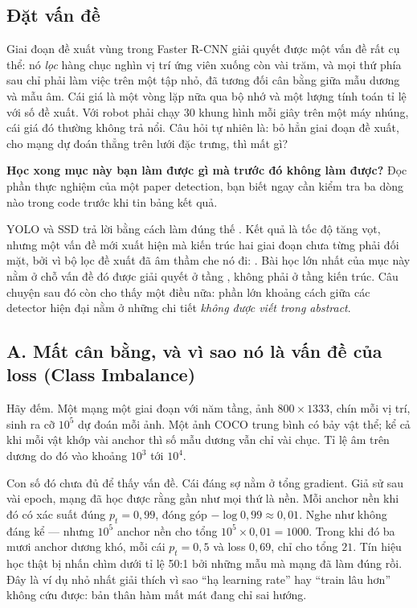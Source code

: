 \documentclass[../../../deep_learning.tex]{subfiles}
\begin{document}
\subsection{Đặt vấn đề}
Giai đoạn đề xuất vùng trong Faster R-CNN giải quyết được một vấn đề rất cụ thể: nó \emph{lọc} hàng chục nghìn vị trí ứng viên xuống còn vài trăm, và mọi thứ phía sau chỉ phải làm việc trên một tập nhỏ, đã tương đối cân bằng giữa mẫu dương và mẫu âm. Cái giá là một vòng lặp nữa qua bộ nhớ và một lượng tính toán tỉ lệ với số đề xuất. Với robot phải chạy 30 khung hình mỗi giây trên một máy nhúng, cái giá đó thường không trả nổi. Câu hỏi tự nhiên là: bỏ hẳn giai đoạn đề xuất, cho mạng dự đoán thẳng trên lưới đặc trưng, thì mất gì?

\textbf{Học xong mục này bạn làm được gì mà trước đó không làm được?} Đọc phần thực nghiệm của một paper detection, bạn biết ngay cần kiểm tra ba dòng nào trong code trước khi tin bảng kết quả.

YOLO và SSD trả lời bằng cách làm đúng thế \cite{redmon2016yolo, liu2016ssd}. Kết quả là tốc độ tăng vọt, nhưng một vấn đề mới xuất hiện mà kiến trúc hai giai đoạn chưa từng phải đối mặt, bởi vì bộ lọc đề xuất đã âm thầm che nó đi: . Bài học lớn nhất của mục này nằm ở chỗ vấn đề đó được giải quyết ở tầng , không phải ở tầng kiến trúc. Câu chuyện sau đó còn cho thấy một điều nữa: phần lớn khoảng cách giữa các detector hiện đại nằm ở những chi tiết \emph{không được viết trong abstract}.

\subsection{A. Mất cân bằng, và vì sao nó là vấn đề của loss (Class Imbalance)}
Hãy đếm. Một mạng một giai đoạn với  năm tầng, ảnh \(800\times1333\), chín  mỗi vị trí, sinh ra cỡ \(10^5\) dự đoán mỗi ảnh. Một ảnh COCO trung bình có bảy vật thể; kể cả khi mỗi vật khớp vài anchor thì số mẫu dương vẫn chỉ vài chục. Tỉ lệ âm trên dương do đó vào khoảng \(10^3\) tới \(10^4\).

Con số đó chưa đủ để thấy vấn đề. Cái đáng sợ nằm ở tổng gradient. Giả sử sau vài epoch, mạng đã học được rằng gần như mọi thứ là nền. Mỗi anchor nền khi đó có xác suất đúng \(p_t = 0{,}99\), đóng góp  \(-\log 0{,}99 \approx 0{,}01\). Nghe như không đáng kể --- nhưng \(10^5\) anchor nền cho tổng \(10^5 \times 0{,}01 = 1000\). Trong khi đó ba mươi anchor dương khó, mỗi cái \(p_t = 0{,}5\) và loss \(0{,}69\), chỉ cho tổng \(21\). Tín hiệu học thật bị nhấn chìm dưới tỉ lệ 50:1 bởi những mẫu mà mạng đã làm đúng rồi. Đây là ví dụ nhỏ nhất giải thích vì sao ``hạ learning rate'' hay ``train lâu hơn'' không cứu được: bản thân hàm mất mát đang chỉ sai hướng.
\end{document}
